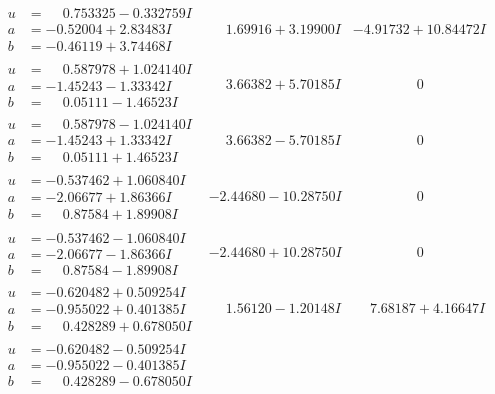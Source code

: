 \documentclass[1p]{elsarticle_modified}
\theoremstyle{definition}
\begin{document}
$$\begin{array}{c|c|c}
\begin{aligned}
u &= \phantom{-}0.753325 - 0.332759 I \\
a &= -0.52004 + 2.83483 I \\
b &= -0.46119 + 3.74468 I\end{aligned}
 & \phantom{-}1.69916 + 3.19900 I & -4.91732 + 10.84472 I \\ \hline\begin{aligned}
u &= \phantom{-}0.587978 + 1.024140 I \\
a &= -1.45243 - 1.33342 I \\
b &= \phantom{-}0.05111 - 1.46523 I\end{aligned}
 & \phantom{-}3.66382 + 5.70185 I & \phantom{-0.000000 } 0 \\ \hline\begin{aligned}
u &= \phantom{-}0.587978 - 1.024140 I \\
a &= -1.45243 + 1.33342 I \\
b &= \phantom{-}0.05111 + 1.46523 I\end{aligned}
 & \phantom{-}3.66382 - 5.70185 I & \phantom{-0.000000 } 0 \\ \hline\begin{aligned}
u &= -0.537462 + 1.060840 I \\
a &= -2.06677 + 1.86366 I \\
b &= \phantom{-}0.87584 + 1.89908 I\end{aligned}
 & -2.44680 - 10.28750 I & \phantom{-0.000000 } 0 \\ \hline\begin{aligned}
u &= -0.537462 - 1.060840 I \\
a &= -2.06677 - 1.86366 I \\
b &= \phantom{-}0.87584 - 1.89908 I\end{aligned}
 & -2.44680 + 10.28750 I & \phantom{-0.000000 } 0 \\ \hline\begin{aligned}
u &= -0.620482 + 0.509254 I \\
a &= -0.955022 + 0.401385 I \\
b &= \phantom{-}0.428289 + 0.678050 I\end{aligned}
 & \phantom{-}1.56120 - 1.20148 I & \phantom{-}7.68187 + 4.16647 I \\ \hline\begin{aligned}
u &= -0.620482 - 0.509254 I \\
a &= -0.955022 - 0.401385 I \\
b &= \phantom{-}0.428289 - 0.678050 I\end{aligned}

\end{array}$$
\end{document}
